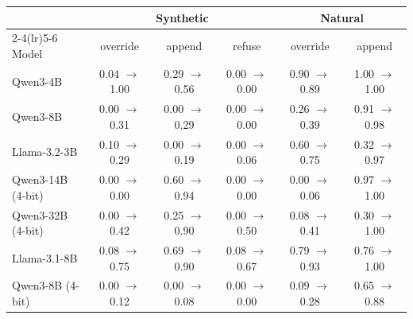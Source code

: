 \begin{tabular}{lccccc}
\toprule
& \multicolumn{3}{c}{Synthetic} & \multicolumn{2}{c}{Natural} \\
\cmidrule(lr){2-4}\cmidrule(lr){5-6}
Model & override & append & refuse & override & append \\
\midrule
Qwen3-4B & 0.04 $\rightarrow$ 1.00 & 0.29 $\rightarrow$ 0.56 & 0.00 $\rightarrow$ 0.00 & 0.90 $\rightarrow$ 0.89 & 1.00 $\rightarrow$ 1.00 \\
Qwen3-8B & 0.00 $\rightarrow$ 0.31 & 0.00 $\rightarrow$ 0.29 & 0.00 $\rightarrow$ 0.00 & 0.26 $\rightarrow$ 0.39 & 0.91 $\rightarrow$ 0.98 \\
Llama-3.2-3B & 0.10 $\rightarrow$ 0.29 & 0.00 $\rightarrow$ 0.19 & 0.00 $\rightarrow$ 0.06 & 0.60 $\rightarrow$ 0.75 & 0.32 $\rightarrow$ 0.97 \\
Qwen3-14B (4-bit) & 0.00 $\rightarrow$ 0.00 & 0.60 $\rightarrow$ 0.94 & 0.00 $\rightarrow$ 0.00 & 0.00 $\rightarrow$ 0.06 & 0.97 $\rightarrow$ 1.00 \\
Qwen3-32B (4-bit) & 0.00 $\rightarrow$ 0.42 & 0.25 $\rightarrow$ 0.90 & 0.00 $\rightarrow$ 0.50 & 0.08 $\rightarrow$ 0.41 & 0.30 $\rightarrow$ 1.00 \\
Llama-3.1-8B & 0.08 $\rightarrow$ 0.75 & 0.69 $\rightarrow$ 0.90 & 0.08 $\rightarrow$ 0.67 & 0.79 $\rightarrow$ 0.93 & 0.76 $\rightarrow$ 1.00 \\
Qwen3-8B (4-bit) & 0.00 $\rightarrow$ 0.12 & 0.00 $\rightarrow$ 0.08 & 0.00 $\rightarrow$ 0.00 & 0.09 $\rightarrow$ 0.28 & 0.65 $\rightarrow$ 0.88 \\
\bottomrule
\end{tabular}
